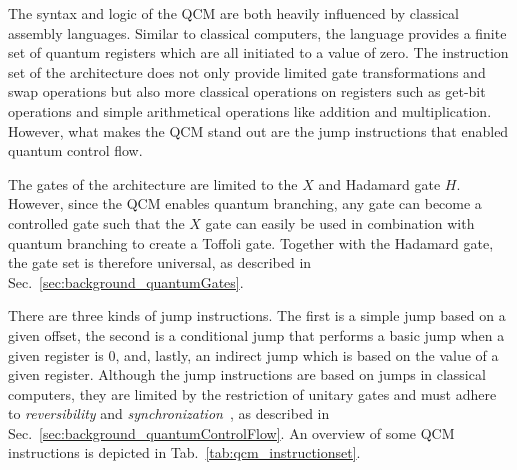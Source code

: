 The syntax and logic of the QCM are both heavily influenced by classical assembly languages. Similar to classical computers,
the language provides a finite set of quantum registers which are all initiated to a value of zero. The instruction set of the architecture does not only provide limited gate transformations and swap operations but also more classical operations on registers such as get-bit operations and simple arithmetical operations like addition and multiplication. However, what makes the QCM stand out are the jump instructions that enabled quantum control flow.

The gates of the architecture are limited to the $X$ and Hadamard gate $H$. However, since the QCM enables quantum branching, any gate can become a controlled gate such that the $X$ gate can easily be used in combination with quantum branching to create a Toffoli gate. Together with the Hadamard gate, the gate set is therefore universal, as described in Sec.~\ref{sec:background_quantumGates}.

There are three kinds of jump instructions. The first is a simple jump based on a given offset, the second is a conditional jump that performs a basic jump when a given register is $0$, and, lastly, an indirect jump which is based on the value of a given register. Although the jump instructions are based on jumps in classical computers, they are limited by the restriction of unitary gates and must adhere to \emph{reversibility} and \emph{synchronization}~\cite{YVC24}, as described in Sec.~\ref{sec:background_quantumControlFlow}. An overview of some QCM instructions is depicted in Tab.~\ref{tab:qcm_instructionset}.

